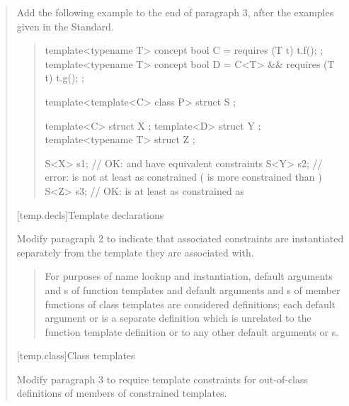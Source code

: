 \begin{quote}
Add the following example to the end of paragraph 3, after the
examples given in the \Cpp Standard.

\begin{quote}
\begin{addedblock}
\enterexample
\begin{codeblock}
template<typename T> concept bool C = requires (T t) { t.f(); };
template<typename T> concept bool D = C<T> && requires (T t) { t.g(); };

template<template<C> class P>
  struct S { };

template<C> struct X { };
template<D> struct Y { };
template<typename T> struct Z { };

S<X> s1; // OK:  and  have equivalent constraints
S<Y> s2; // error:  is not at least as constrained  ( is more constrained than )
S<Z> s3; // OK:  is at least as constrained as 
\end{codeblock}
\exitexample
\end{addedblock}
\end{quote}


\setcounter{section}{5}
[temp.decls]{Template declarations}

Modify paragraph 2 to indicate that associated constraints are
instantiated separately from the template they are associated with.

\begin{quote}
\setcounter{Paras}{1}
For purposes of name lookup and instantiation, default 
arguments and
s of function templates and default
arguments and 
s of member functions of class
templates are considered definitions; each default 
argument or 
 is a separate definition which is 
unrelated to the function template definition or to any other default 
arguments or 
s.
\end{quote}


[temp.class]{Class templates}

Modify paragraph 3 to require template constraints for out-of-class
definitions of members of constrained templates. 


\end{quote}
